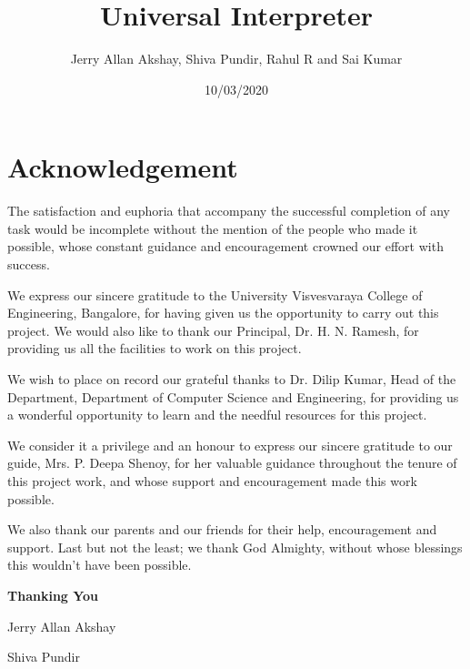 \documentclass[14pt]{report}
\title{Universal Interpreter}
\date{10/03/2020}
\author{Jerry Allan Akshay, Shiva Pundir, Rahul R and Sai Kumar}
\begin{document}


 	\maketitle

	\newpage


	\chapter*{Acknowledgement}\label{chapter}
		

		The satisfaction and euphoria that accompany the successful completion of any task would be incomplete without the mention of the people who made it possible, whose constant guidance and encouragement crowned our effort with success. \newline
		 
		We express our sincere gratitude to the University Visvesvaraya College of Engineering, Bangalore, for having given us the opportunity to carry out this project. We would also like to thank our Principal, Dr. H. N. Ramesh, for providing us all the facilities to work on this project. \newline
	 
		We wish to place on record our grateful thanks to Dr. Dilip Kumar, Head of the Department, Department of Computer Science and Engineering, for providing us a wonderful opportunity to learn and the needful resources for this project. \newline 
	 
		We consider it a privilege and an honour to express our sincere gratitude to our guide, Mrs. P. Deepa Shenoy, for her valuable guidance throughout the tenure of this project work, and whose support and encouragement made this work possible.  \newline
	 
		We also thank our parents and our friends for their help, encouragement and support. Last but not the least; we thank God Almighty, without whose blessings this wouldn't have been possible. \newline 

		\hfill \textbf{Thanking You} 

		\hfill Jerry Allan Akshay 

		\hfill Shiva Pundir 
\end{document}
